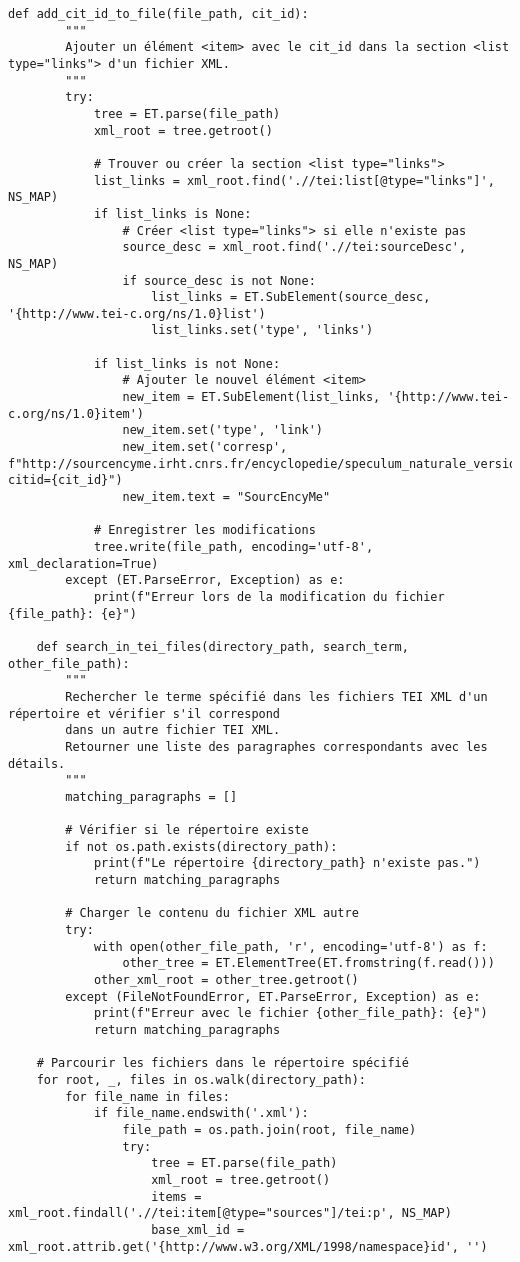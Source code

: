 \begin{lstlisting}[breaklines=true]
	def add_cit_id_to_file(file_path, cit_id):
		"""
		Ajouter un élément <item> avec le cit_id dans la section <list type="links"> d'un fichier XML.
		"""
		try:
			tree = ET.parse(file_path)
			xml_root = tree.getroot()
		
			# Trouver ou créer la section <list type="links">
			list_links = xml_root.find('.//tei:list[@type="links"]', NS_MAP)
			if list_links is None:
				# Créer <list type="links"> si elle n'existe pas
				source_desc = xml_root.find('.//tei:sourceDesc', NS_MAP)
				if source_desc is not None:
					list_links = ET.SubElement(source_desc, '{http://www.tei-c.org/ns/1.0}list')
					list_links.set('type', 'links')
		
			if list_links is not None:
				# Ajouter le nouvel élément <item>
				new_item = ET.SubElement(list_links, '{http://www.tei-c.org/ns/1.0}item')
				new_item.set('type', 'link')
				new_item.set('corresp', f"http://sourcencyme.irht.cnrs.fr/encyclopedie/speculum_naturale_version_sm_trifaria_ed_douai_1624?citid={cit_id}")
				new_item.text = "SourcEncyMe"
		
			# Enregistrer les modifications
			tree.write(file_path, encoding='utf-8', xml_declaration=True)
		except (ET.ParseError, Exception) as e:
			print(f"Erreur lors de la modification du fichier {file_path}: {e}")
	
	def search_in_tei_files(directory_path, search_term, other_file_path):
		"""
		Rechercher le terme spécifié dans les fichiers TEI XML d'un répertoire et vérifier s'il correspond
		dans un autre fichier TEI XML.
		Retourner une liste des paragraphes correspondants avec les détails.
		"""
		matching_paragraphs = []
	
		# Vérifier si le répertoire existe
		if not os.path.exists(directory_path):
			print(f"Le répertoire {directory_path} n'existe pas.")
			return matching_paragraphs
	
		# Charger le contenu du fichier XML autre
		try:
			with open(other_file_path, 'r', encoding='utf-8') as f:
				other_tree = ET.ElementTree(ET.fromstring(f.read()))
			other_xml_root = other_tree.getroot()
		except (FileNotFoundError, ET.ParseError, Exception) as e:
			print(f"Erreur avec le fichier {other_file_path}: {e}")
			return matching_paragraphs
	
	# Parcourir les fichiers dans le répertoire spécifié
	for root, _, files in os.walk(directory_path):
		for file_name in files:
			if file_name.endswith('.xml'):
				file_path = os.path.join(root, file_name)
				try:
					tree = ET.parse(file_path)
					xml_root = tree.getroot()
					items = xml_root.findall('.//tei:item[@type="sources"]/tei:p', NS_MAP)
					base_xml_id = xml_root.attrib.get('{http://www.w3.org/XML/1998/namespace}id', '')
	

\end{lstlisting}
